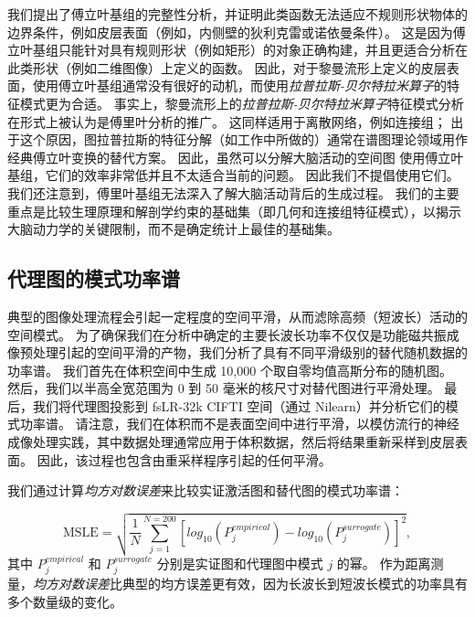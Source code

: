 \documentclass[lang=cn,a4paper,newtx,citestyle=gb7714-2015, bibstyle=gb7714-2015]{elegantpaper}
\begin{document}
我们提出了傅立叶基组的完整性分析，并证明此类函数无法适应不规则形状物体的边界条件，例如皮层表面（例如，内侧壁的狄利克雷或诺依曼条件）\cite{hasson2008hierarchy}。
这是因为傅立叶基组只能针对具有规则形状（例如矩形）的对象正确构建，并且更适合分析在此类形状（例如二维图像）上定义的函数。
因此，对于黎曼流形上定义的皮层表面，使用傅立叶基组通常没有很好的动机，而使用\textit{拉普拉斯-贝尔特拉米算子}的特征模式更为合适\cite{murray2014hierarchy,glasser2011mapping}。
事实上，黎曼流形上的\textit{拉普拉斯-贝尔特拉米算子}特征模式分析在形式上被认为是傅里叶分析\cite{gao2020neuronal}的推广。
这同样适用于离散网络，例如连接组；
出于这个原因，图拉普拉斯的特征分解（如工作中所做的）通常在谱图理论领域用作经典傅立叶变换的替代方案\cite{tian2020topographic}。
因此，虽然可以分解大脑活动的空间图 使用傅立叶基组，它们的效率非常低并且不太适合当前的问题。
因此我们不提倡使用它们。
我们还注意到，傅里叶基组无法深入了解大脑活动背后的生成过程。
我们的主要重点是比较生理原理和解剖学约束的基础集（即几何和连接组特征模式），以揭示大脑动力学的关键限制，而不是确定统计上最佳的基础集。





\subsection{代理图的模式功率谱} \label{sec:modal_power_spectra}


典型的图像处理流程会引起一定程度的空间平滑，从而滤除高频（短波长）活动的空间模式。
为了确保我们在分析中确定的主要长波长功率不仅仅是功能磁共振成像预处理引起的空间平滑的产物，我们分析了具有不同平滑级别的替代随机数据的功率谱。
我们首先在体积空间中生成 10,000 个取自零均值高斯分布的随机图。
然后，我们以半高全宽范围为 0 到 50 毫米的核尺寸对替代图进行平滑处理。
最后，我们将代理图投影到 fsLR-32k CIFTI 空间（通过 Nilearn）并分析它们的模式功率谱。
请注意，我们在体积而不是表面空间中进行平滑，以模仿流行的神经成像处理实践，其中数据处理通常应用于体积数据，然后将结果重新采样到皮层表面\cite{haak2018connectopic}。
因此，该过程也包含由重采样程序引起的任何平滑。


我们通过计算\textit{均方对数误差}来比较实证激活图和替代图的模式功率谱：

\begin{equation}\label{eq:MSLE}
	\text{MSLE} = \sqrt{
				\frac{1}{N}
					\sum_{j=1}^{N=200}
					[ log_10 (P_j^{empirical}) - 
					log_10 (P_j^{surrogate}) ] ^2
				},
\end{equation}
%
其中 $ P_j^{empirical} $ 和 $ P_j^{surrogate} $ 分别是实证图和代理图中模式 $ j $ 的幂。
作为距离测量，\textit{均方对数误差}比典型的均方误差更有效，因为长波长到短波长模式的功率具有多个数量级的变化。
\end{document}
